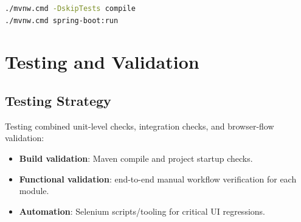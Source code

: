 \documentclass[12pt,a4paper]{article}
\begin{document}
\begin{lstlisting}[language=bash,caption={Project run commands used during validation}]
./mvnw.cmd -DskipTests compile
./mvnw.cmd spring-boot:run
\end{lstlisting}

\newpage
\section{Testing and Validation}

\subsection{Testing Strategy}
Testing combined unit-level checks, integration checks, and browser-flow validation:
\begin{itemize}[leftmargin=*]
    \item \textbf{Build validation}: Maven compile and project startup checks.
    \item \textbf{Functional validation}: end-to-end manual workflow verification for each module.
    \item \textbf{Automation}: Selenium scripts/tooling for critical UI regressions.
\end{itemize}
\end{document}
